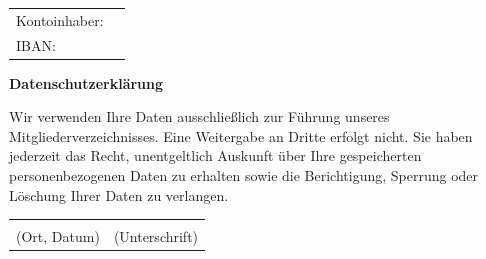 \documentclass[a4paper,12pt]{article}
\begin{document}
\renewcommand{\arraystretch}{1.8}

\begin{tabularx}{\textwidth}{p{6cm} X}
Kontoinhaber: & \hrulefill \\
IBAN: & \hrulefill \\
\end{tabularx}

\vspace{1.2em}

\textbf{Datenschutzerklärung}\\

\vspace{.2em}

{\small
Wir verwenden Ihre Daten ausschließlich zur Führung unseres Mitgliederverzeichnisses. 
Eine Weitergabe an Dritte erfolgt nicht. Sie haben jederzeit das Recht, unentgeltlich Auskunft über Ihre 
gespeicherten personenbezogenen Daten zu erhalten sowie die Berichtigung, Sperrung oder Löschung Ihrer 
Daten zu verlangen.
}

\vspace{2em}

\begin{tabularx}{\textwidth}{X X}
\hrulefill & \hrulefill \\
\small (Ort, Datum) & \small (Unterschrift)
\end{tabularx}
\end{document}
